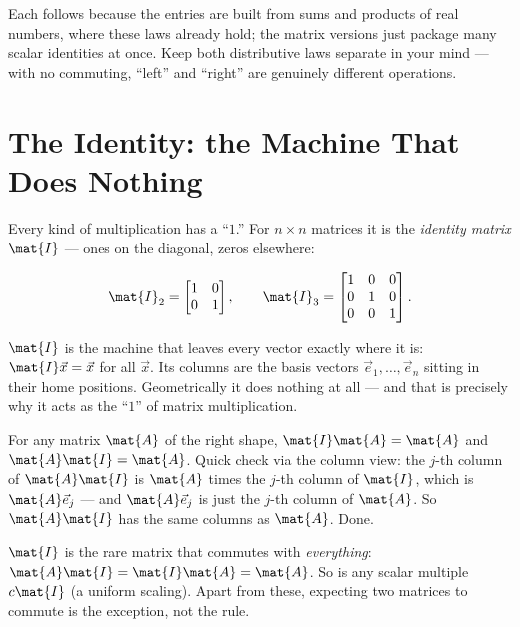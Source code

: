 Each follows because the entries are built from sums and products of real numbers, where
these laws already hold; the matrix versions just package many scalar identities at once.
Keep both distributive laws separate in your mind --- with no commuting, ``left'' and
``right'' are genuinely different operations.

\section{The Identity: the Machine That Does Nothing}
\label{ch08:identity}

Every kind of multiplication has a ``$1$.'' For $n\times n$ matrices it is the
\emph{identity matrix} $\mat{I}$ --- ones on the diagonal, zeros elsewhere:

\[
\mat{I}_2 = \begin{bmatrix} 1 & 0 \\ 0 & 1 \end{bmatrix},
\qquad
\mat{I}_3 = \begin{bmatrix} 1 & 0 & 0 \\ 0 & 1 & 0 \\ 0 & 0 & 1 \end{bmatrix}.
\]

\begin{intuitionbox}
$\mat{I}$ is the machine that leaves every vector exactly where it is: $\mat{I}\vec{x} = \vec{x}$ for all $\vec{x}$. Its columns are the basis vectors $\vec{e}_1,\dots,\vec{e}_n$
sitting in their home positions. Geometrically it does nothing at all --- and that is
precisely why it acts as the ``$1$'' of matrix multiplication.
\end{intuitionbox}

For any matrix $\mat{A}$ of the right shape, $\mat{I}\mat{A} = \mat{A}$ and
$\mat{A}\mat{I} = \mat{A}$. Quick check via the column view: the $j$-th column of
$\mat{A}\mat{I}$ is $\mat{A}$ times the $j$-th column of $\mat{I}$, which is
$\mat{A}\vec{e}_j$ --- and $\mat{A}\vec{e}_j$ is just the $j$-th column of $\mat{A}$.
So $\mat{A}\mat{I}$ has the same columns as $\mat{A}$. Done.

\begin{remark}
$\mat{I}$ is the rare matrix that commutes with \emph{everything}: $\mat{A}\mat{I} = \mat{I}\mat{A} = \mat{A}$. So is any scalar multiple $c\mat{I}$ (a uniform scaling). Apart
from these, expecting two matrices to commute is the exception, not the rule.
\end{remark}

